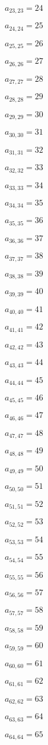 \documentclass[a4paper,12pt]{article}
\begin{document}
$a _{ 23, 23 } = 24$

$a _{ 24, 24 } = 25$

$a _{ 25, 25 } = 26$

$a _{ 26, 26 } = 27$

$a _{ 27, 27 } = 28$

$a _{ 28, 28 } = 29$

$a _{ 29, 29 } = 30$

$a _{ 30, 30 } = 31$

$a _{ 31, 31 } = 32$

$a _{ 32, 32 } = 33$

$a _{ 33, 33 } = 34$

$a _{ 34, 34 } = 35$

$a _{ 35, 35 } = 36$

$a _{ 36, 36 } = 37$

$a _{ 37, 37 } = 38$

$a _{ 38, 38 } = 39$

$a _{ 39, 39 } = 40$

$a _{ 40, 40 } = 41$

$a _{ 41, 41 } = 42$

$a _{ 42, 42 } = 43$

$a _{ 43, 43 } = 44$

$a _{ 44, 44 } = 45$

$a _{ 45, 45 } = 46$

$a _{ 46, 46 } = 47$

$a _{ 47, 47 } = 48$

$a _{ 48, 48 } = 49$

$a _{ 49, 49 } = 50$

$a _{ 50, 50 } = 51$

$a _{ 51, 51 } = 52$

$a _{ 52, 52 } = 53$

$a _{ 53, 53 } = 54$

$a _{ 54, 54 } = 55$

$a _{ 55, 55 } = 56$

$a _{ 56, 56 } = 57$

$a _{ 57, 57 } = 58$

$a _{ 58, 58 } = 59$

$a _{ 59, 59 } = 60$

$a _{ 60, 60 } = 61$

$a _{ 61, 61 } = 62$

$a _{ 62, 62 } = 63$

$a _{ 63, 63 } = 64$

$a _{ 64, 64 } = 65$
\end{document}
